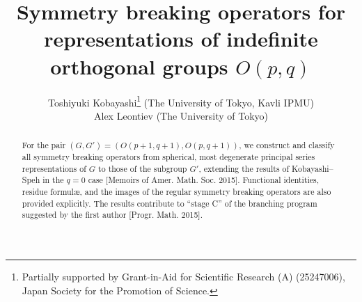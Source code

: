 \documentclass[12pt]{article} %
\theoremstyle{definition}
\theoremstyle{exampstyle} \newtheorem{examp}[theorem]{Theorem}
\begin{document}
\title{Symmetry breaking operators for representations of indefinite orthogonal groups $O(p,q)$}

\author{Toshiyuki Kobayashi\thanks{Partially supported by Grant-in-Aid for Scientific
	Research (A) (25247006), Japan Society for the Promotion of Science.} (The University of Tokyo, Kavli IPMU)\\
  Alex Leontiev (The University of Tokyo)}




  \maketitle
\begin{abstract}
For the pair $(G, G') =(O(p+1, q+1), O(p,q+1))$, we construct and classify
all symmetry breaking operators from spherical, most degenerate 
principal series representations of 
$G$ to those of the subgroup $G'$, extending the results of Kobayashi--Speh in the $q=0$ 
case [Memoirs of Amer. Math. Soc. 2015].
Functional identities, residue formul\ae, and the images of the regular symmetry breaking operators are also provided 
explicitly.
The results contribute to ``stage C'' of the branching program suggested by the first author [Progr. Math. 2015].
\end{abstract}
\end{document}
